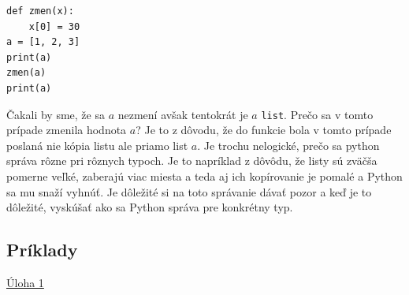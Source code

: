 \documentclass{article}
\begin{document}
\begin{lstlisting}
def zmen(x):
    x[0] = 30
a = [1, 2, 3]
print(a)
zmen(a)
print(a)
\end{lstlisting}

Čakali by sme, že sa $a$ nezmení avšak tentokrát je $a$ \texttt{list}. Prečo sa v tomto prípade zmenila hodnota $a$? Je to z dôvodu, že do funkcie bola v tomto prípade poslaná nie kópia listu ale priamo list $a$. Je trochu nelogické, prečo sa python správa rôzne pri rôznych typoch. Je to napríklad z dôvôdu, že listy sú zväčša pomerne veľké, zaberajú viac miesta a teda aj ich kopírovanie je pomalé a Python sa mu snaží vyhnúť. Je dôležité si na toto správanie dávať pozor a keď je to dôležité, vyskúšať ako sa Python správa pre konkrétny typ.

\subsection{Príklady}
\href{https://testovac.ksp.sk/tasks/ls-uvod-tlacitka/}{Úloha 1}





\end{document}
